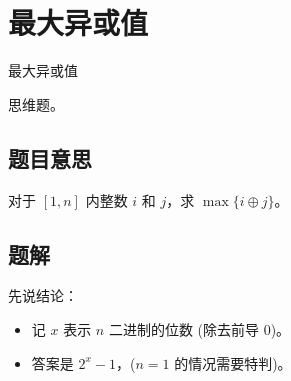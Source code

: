 \def\sectionName{最大异或值}
\section[\TOCName]{\sectionName}



\begin{frame}

\isBeamerMode\relax
    {\Huge \sectionName}\par
\fi




思维题。



\end{frame}

\subsection{题目意思}
\begin{frame} %
对于 $[1, n]$ 内整数 $i$ 和 $j$，求 $\max\{i \oplus j\}$。
\end{frame}



\subsection{题解}
\begin{frame} %
先说结论：
\begin{itemize}
    \item 记 $x$ 表示 $n$ 二进制的位数 (除去前导 $0$)。
    \item 答案是 $2^x - 1$，($n = 1$ 的情况需要特判)。
\end{itemize}
\end{frame}


